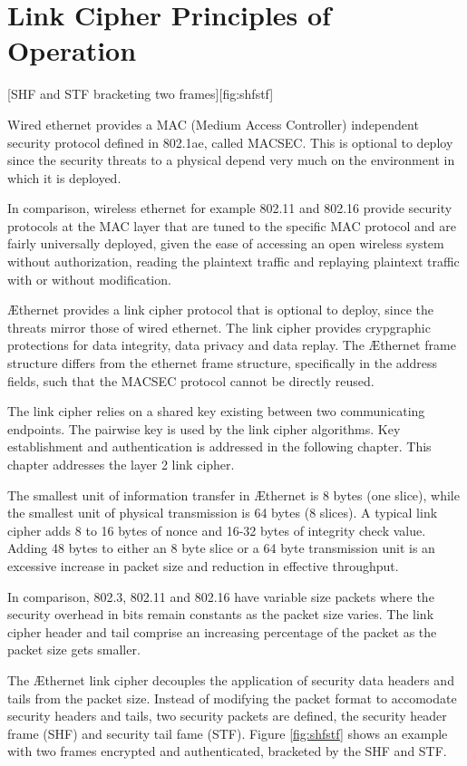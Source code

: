 \documentclass[../../../OAE-SPEC-MAIN.tex]{subfiles}
\begin{document}
\section{Link Cipher Principles of Operation}

[SHF and STF bracketing two frames][fig:shfstf]

Wired ethernet provides a MAC (Medium Access Controller) independent security protocol defined in 802.1ae, called MACSEC. This is optional to deploy since the security threats to a physical depend very much on the environment in which it is deployed.
 
In comparison, wireless ethernet for example 802.11 and 802.16 provide security protocols at the MAC layer that are tuned to the specific MAC protocol and are fairly universally deployed, given the ease of accessing an open wireless system without authorization, reading the plaintext traffic and replaying plaintext traffic with or without modification.

\AE thernet provides a link cipher protocol that is optional to deploy, since the threats mirror those of wired ethernet. The link cipher provides crypgraphic protections for data integrity, data privacy and data replay. The \AE thernet frame structure differs from the ethernet frame structure, specifically in the address fields, such that the MACSEC protocol cannot be directly reused.

The link cipher relies on a shared key existing between two communicating endpoints. The pairwise key is used by the link cipher algorithms. Key establishment and authentication is addressed in the following chapter. This chapter addresses the layer 2 link cipher.

The smallest unit of information transfer in \AE thernet is 8 bytes (one slice), while the smallest unit of physical transmission is 64 bytes (8 slices). A typical link cipher adds 8 to 16 bytes of nonce and 16-32 bytes of integrity check value. Adding 48 bytes to either an 8 byte slice or a 64 byte transmission unit is an excessive increase in packet size and reduction in effective throughput.

In comparison, 802.3, 802.11 and 802.16 have variable size packets where the security overhead in bits remain constants as the packet size varies. The link cipher header and tail comprise an increasing percentage of the packet as the packet size gets smaller. 

The \AE thernet link cipher decouples the application of security data headers and tails from the packet size. Instead of modifying the packet format to accomodate security headers and tails, two security packets are defined, the security header frame (SHF) and security tail fame (STF). Figure \ref{fig:shfstf} shows an example with two frames encrypted and authenticated, bracketed by the SHF and STF.
\end{document}
